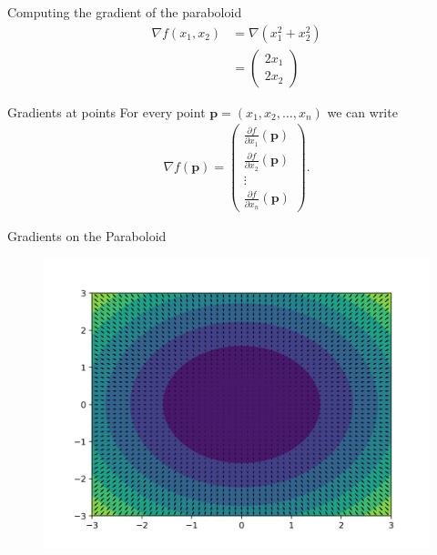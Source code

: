 \documentclass{beamer}
\begin{document}
    \begin{frame}{Computing the gradient of the paraboloid}
      \begin{align}
        \nabla f(x_1, x_2) &= \nabla (x_1^2 + x_2^2) \\
                           &= \begin{pmatrix}
                              2x_1 \\
                              2x_2
                              \end{pmatrix}
      \end{align}
    \end{frame}

    \begin{frame}{Gradients at points}
      For every point $\mathbf{p} = (x_1, x_2, \dots , x_n)$ we can write
      \begin{align}
        \nabla f (\mathbf{p}) = \begin{pmatrix}
          \frac{\partial f}{\partial x_1} (\mathbf{p}) \\
          \frac{\partial f}{\partial x_2} (\mathbf{p}) \\
          \vdots \\
          \frac{\partial f}{\partial x_n} (\mathbf{p}) 
        \end{pmatrix}.
      \end{align}
    \end{frame}


    \begin{frame}{Gradients on the Paraboloid}
      \begin{figure}
        \includegraphics[width=.9\linewidth]{./figures/quiver_paraboloid.png}
      \end{figure}
    \end{frame}
\end{document}
